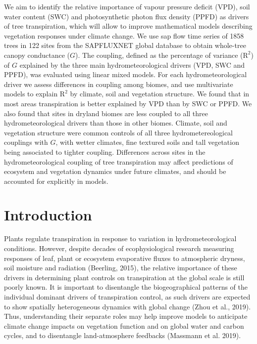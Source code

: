\documentclass[11pt,twoside]{reedthesis}
\begin{document}
We aim to identify the relative importance of vapour pressure deficit
(VPD), soil water content (SWC) and photosynthetic photon flux density
(PPFD) as drivers of tree transpiration, which will allow to improve
mathematical models describing vegetation responses under climate
change. We use sap flow time series of 1858 trees in 122 sites from the
SAPFLUXNET global database to obtain whole-tree canopy conductance
(\(G\)). The coupling, defined as the percentage of variance
(\(\text{R}^{2}\)) of \(G\) explained by the three main
hydrometeorological drivers (VPD, SWC and PPFD), was evaluated using
linear mixed models. For each hydrometeorological driver we assess
differences in coupling among biomes, and use multivariate models to
explain \(\text{R}^{2}\) by climate, soil and vegetation structure. We
found that in most areas transpiration is better explained by VPD than
by SWC or PPFD. We also found that sites in dryland biomes are less
coupled to all three hydrometeorological drivers than those in other
biomes. Climate, soil and vegetation structure were common controls of
all three hydrometereological couplings with \(G\), with wetter
climates, fine textured soils and tall vegetation being associated to
tighter coupling. Differences across sites in the hydrometeorological
coupling of tree transpiration may affect predictions of ecosystem and
vegetation dynamics under future climates, and should be accounted for
explicitly in models.\par  \newpage

\section{Introduction}\label{introduction}

Plants regulate transpiration in response to variation in
hydrometeorological conditions. However, despite decades of
ecophysiological research measuring responses of leaf, plant or
ecosystem evaporative fluxes to atmospheric dryness, soil moisture and
radiation (Beerling, 2015), the relative importance of these drivers in
determining plant controls on transpiration at the global scale is still
poorly known. It is important to disentangle the biogeographical
patterns of the individual dominant drivers of transpiration control, as
such drivers are expected to show spatially heterogeneous dynamics with
global change (Zhou et al., 2019). Thus, understanding their separate
roles may help improve models to anticipate climate change impacts on
vegetation function and on global water and carbon cycles, and to
disentangle land-atmosphere feedbacks (Massmann et al. 2019).\par
\end{document}
